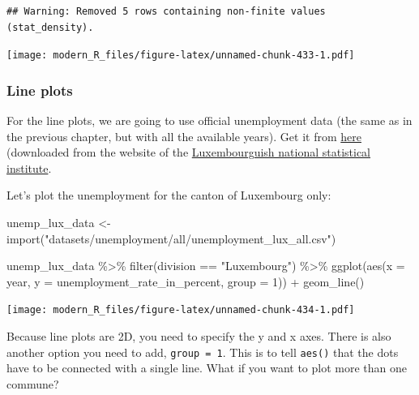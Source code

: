 \documentclass[
]{article}
\newenvironment{Shaded}{\begin{snugshade}}{\end{snugshade}}
\newcommand{\AttributeTok}[1]{\textcolor[rgb]{0.77,0.63,0.00}{#1}}
\newcommand{\DecValTok}[1]{\textcolor[rgb]{0.00,0.00,0.81}{#1}}
\newcommand{\FunctionTok}[1]{\textcolor[rgb]{0.00,0.00,0.00}{#1}}
\newcommand{\NormalTok}[1]{#1}
\newcommand{\OtherTok}[1]{\textcolor[rgb]{0.56,0.35,0.01}{#1}}
\newcommand{\SpecialCharTok}[1]{\textcolor[rgb]{0.00,0.00,0.00}{#1}}
\newcommand{\StringTok}[1]{\textcolor[rgb]{0.31,0.60,0.02}{#1}}
\begin{document}
\begin{verbatim}
## Warning: Removed 5 rows containing non-finite values (stat_density).
\end{verbatim}

\texttt{[image: modern\_R\_files/figure-latex/unnamed-chunk-433-1.pdf]}

\hypertarget{line-plots}{%
\subsubsection{Line plots}\label{line-plots}}

For the line plots, we are going to use official unemployment data (the same as in the previous
chapter, but with all the available years). Get it from
\href{https://github.com/b-rodrigues/modern_R/tree/master/datasets/unemployment/all}{here}
(downloaded from the website of the \href{https://lustat.statec.lu/vis?pg=0\&df\%5Bds\%5D=release\&df\%5Bid\%5D=DF_X026\&df\%5Bag\%5D=LU1\&df\%5Bvs\%5D=1.0\&pd=2021\%2C\&dq=..A\&ly\%5Brw\%5D=SPECIFICATION\&ly\%5Bcl\%5D=VARIABLE\&lc=en}{Luxembourguish national statistical institute}.

Let's plot the unemployment for the canton of Luxembourg only:

\begin{Shaded}
\begin{Highlighting}[]
\NormalTok{unemp\_lux\_data }\OtherTok{\textless{}{-}} \FunctionTok{import}\NormalTok{(}\StringTok{"datasets/unemployment/all/unemployment\_lux\_all.csv"}\NormalTok{)}

\NormalTok{unemp\_lux\_data }\SpecialCharTok{\%\textgreater{}\%}
  \FunctionTok{filter}\NormalTok{(division }\SpecialCharTok{==} \StringTok{"Luxembourg"}\NormalTok{) }\SpecialCharTok{\%\textgreater{}\%}
  \FunctionTok{ggplot}\NormalTok{(}\FunctionTok{aes}\NormalTok{(}\AttributeTok{x =}\NormalTok{ year, }\AttributeTok{y =}\NormalTok{ unemployment\_rate\_in\_percent, }\AttributeTok{group =} \DecValTok{1}\NormalTok{)) }\SpecialCharTok{+}
  \FunctionTok{geom\_line}\NormalTok{()}
\end{Highlighting}
\end{Shaded}

\texttt{[image: modern\_R\_files/figure-latex/unnamed-chunk-434-1.pdf]}

Because line plots are 2D, you need to specify the y and x axes. There is also another option you
need to add, \texttt{group\ =\ 1}. This is to tell \texttt{aes()} that the dots have to be connected with a single
line. What if you want to plot more than one commune?
\end{document}
